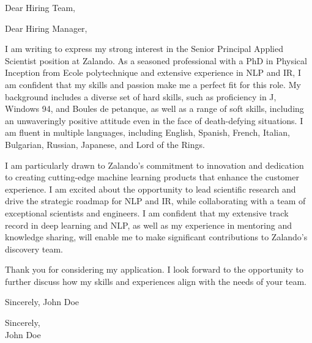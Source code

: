 \documentclass[a4paper,10pt]{letter}
\begin{document}
\begin{letter}{}
\opening{Dear Hiring Team,}

Dear Hiring Manager,

I am writing to express my strong interest in the Senior Principal Applied Scientist position at Zalando. As a seasoned professional with a PhD in Physical Inception from Ecole polytechnique and extensive experience in NLP and IR, I am confident that my skills and passion make me a perfect fit for this role. My background includes a diverse set of hard skills, such as proficiency in J, Windows 94, and Boules de petanque, as well as a range of soft skills, including an unwaveringly positive attitude even in the face of death-defying situations. I am fluent in multiple languages, including English, Spanish, French, Italian, Bulgarian, Russian, Japanese, and Lord of the Rings.

I am particularly drawn to Zalando's commitment to innovation and dedication to creating cutting-edge machine learning products that enhance the customer experience. I am excited about the opportunity to lead scientific research and drive the strategic roadmap for NLP and IR, while collaborating with a team of exceptional scientists and engineers. I am confident that my extensive track record in deep learning and NLP, as well as my experience in mentoring and knowledge sharing, will enable me to make significant contributions to Zalando's discovery team.

Thank you for considering my application. I look forward to the opportunity to further discuss how my skills and experiences align with the needs of your team.

Sincerely,
John Doe

\closing{Sincerely,\\John Doe}

\end{letter}
\end{document}
